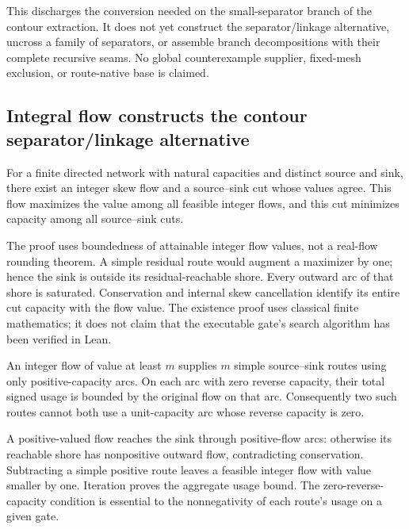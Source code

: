 This discharges the conversion needed on the small-separator branch of
the contour extraction.  It does not yet construct the separator/linkage
alternative, uncross a family of separators, or assemble branch
decompositions with their complete recursive seams.  No global
counterexample supplier, fixed-mesh exclusion, or route-native base is
claimed.

\subsection{Integral flow constructs the contour separator/linkage alternative}
\label{sec:integral-contour-linkage}

\begin{theorem}
For a finite directed network with natural capacities and distinct source
and sink, there exist an integer skew flow and a source--sink cut whose
values agree.  This flow maximizes the value among all feasible integer
flows, and this cut minimizes capacity among all source--sink cuts.
\end{theorem}

The proof uses boundedness of attainable integer flow values, not a
real-flow rounding theorem.  A simple residual route would augment a
maximizer by one; hence the sink is outside its residual-reachable shore.
Every outward arc of that shore is saturated.  Conservation and internal
skew cancellation identify its entire cut capacity with the flow value.
The existence proof uses classical finite mathematics; it does not claim
that the executable gate's search algorithm has been verified in Lean.

\begin{theorem}
An integer flow of value at least $m$ supplies $m$ simple source--sink
routes using only positive-capacity arcs.  On each arc with zero reverse
capacity, their total signed usage is bounded by the original flow on
that arc.  Consequently two such routes cannot both use a unit-capacity
arc whose reverse capacity is zero.
\end{theorem}

A positive-valued flow reaches the sink through positive-flow arcs:
otherwise its reachable shore has nonpositive outward flow, contradicting
conservation.  Subtracting a simple positive route leaves a feasible
integer flow with value smaller by one.  Iteration proves the aggregate
usage bound.  The zero-reverse-capacity condition is essential to the
nonnegativity of each route's usage on a given gate.

